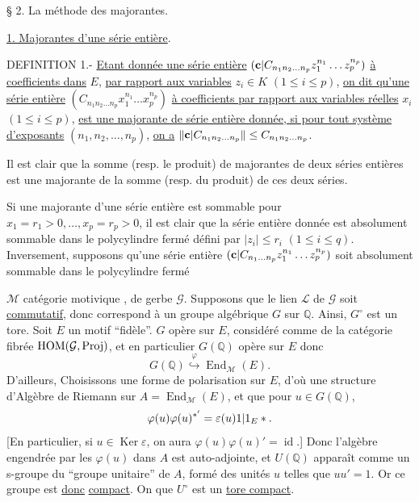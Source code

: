 \begin{center}
§ 2. La méthode des majorantes.
\end{center}

\uline{1. Majorantes d'une série entière}.

DEFINITION 1.- \uline{Etant donnée une série entière}
$(\mathbf c|C_{n_1n_2\ldots n_p}z_1^{n_1}\ldots z_p^{n_p})$
\uline{à coefficients dans} $E$, \uline{par rapport aux variables}
$z_i\in K$ $(1\leq i\leq p)$,
\uline{on dit qu'une série entière}
$(C_{n_1n_2\ldots n_p}x_1^{n_1}\ldots x_p^{n_p})$
\uline{à coefficients }
\uline{par rapport aux variables réelles} $x_i$ $(1\leq i\leq p)$,
\uline{est une majorante de  série entière donnée, si pour tout système d'exposants}
$(n_1,n_2,\ldots,n_p)$, \uline{on a}
$\|\mathbf c|C_{n_1n_2\ldots n_p}\|\leq C_{n_1n_2\ldots n_p}$.

Il est clair que la somme (resp. le produit) de majorantes de deux séries
entières est une majorante de la somme (resp. du produit) de ces deux séries.

Si une majorante d'une série entière est sommable pour
$x_1=r_1>0,\ldots,x_p=r_p>0$, il est clair que la série entière donnée
est absolument sommable dans le polycylindre fermé défini par
$|z_i|\leq r_i$ $(1\leq i\leq q)$.
Inversement, supposons qu'une série entière
$(\mathbf c|C_{n_1\ldots n_p}z_1^{n_1}\ldots z_p^{n_p})$
soit absolument sommable dans le polycylindre fermé


$\mathcal M$ catégorie motivique ,
de gerbe $\mathcal G$. Supposons que le lien $\mathcal L$ de $\mathcal G$
soit \uline{commutatif}, donc correspond à un groupe algébrique
 $G$ sur $\mathbb Q$.
Ainsi, $G^\circ$ est un tore. Soit $E$ un motif ``fidèle''.
 $G$ opère sur $E$, considéré comme
de la catégorie fibrée $\operatorname{HOM}(\mathcal G,\mathrm{Proj})$,
et en particulier $G(\mathbb Q)$ opère sur $E$ donc
\[
G(\mathbb Q)\overset{\varphi}{\hookrightarrow}\operatorname{End}_{\mathcal M}(E).
\]
D'ailleurs,
Choisissons une forme de polarisation sur $E$, d'où une structure
d'Algèbre de Riemann sur $A=\operatorname{End}_{\mathcal M}(E)$,
et  que pour $u\in G(\mathbb Q)$,
\[
\varphi(u)\varphi(u)^{*'}=
\varepsilon(u)1|1_E*.
\]
[En particulier, si $u\in\operatorname{Ker}\varepsilon$,
on aura $\varphi(u)\varphi(u)'=\operatorname{id}$.]
Donc l'algèbre engendrée par les $\varphi(u)$ dans $A$ est auto-adjointe,
et $U(\mathbb Q)$ apparaît comme un s-groupe du
``groupe unitaire'' de $A$, formé des unités $u$ telles que $uu'=1$.
Or ce  groupe est
 \uline{donc} \uline{compact}.
On  que $U^\circ$ est un \uline{tore compact}.

